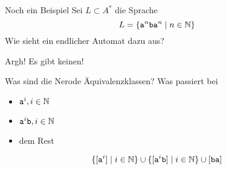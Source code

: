\begin{frame}{Noch ein Beispiel}
	Sei $L \subset A^\ast$ die Sprache 
	$$L = \{ \mathtt a^n \mathtt b \mathtt a^n \mid n \in \mathbb{N}\}$$ Wie sieht ein endlicher Automat dazu aus? \pause
	\begin{minipage}{0.49\linewidth}\vspace*{8em}
		\centering \vfill
		Argh! Es gibt keinen! \vspace*{4em}
	\end{minipage}\pause
	\begin{minipage}{0.49\linewidth}
		Was sind die Nerode Äquivalenz\-klassen? \pause
		Was passiert bei
		\begin{itemize}[<+->]
			\item $\mathtt a^i, i \in \mathbb{N}$
			\item $\mathtt a^i \mathtt b, i \in \mathbb{N}$
			\item dem Rest
		\end{itemize} \pause
		$$\{[\mathtt a^i] \mid i \in \mathbb{N}\} \cup \{[\mathtt a^i \mathtt b] \mid i \in \mathbb{N}\} \cup [\mathtt{ba}]$$
		
	\end{minipage}
\end{frame}


